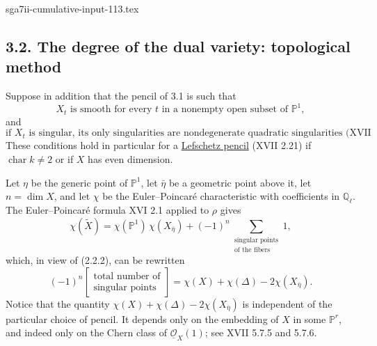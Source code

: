 \begin{filecontents*}{sga7ii-cumulative-input-113.tex}
\subsection*{3.2. The degree of the dual variety: topological method}

Suppose in addition that the pencil of 3.1 is such that
\begin{equation}\tag{3.2.1}
X_t\text{ is smooth for every }t\text{ in a nonempty open subset of }
\mathbb P^1,
\end{equation}
and
\begin{equation}\tag{3.2.2}
\text{if $X_t$ is singular, its only singularities are nondegenerate
quadratic singularities (XVII 1.1).}
\end{equation}
These conditions hold in particular for a \underline{Lefschetz pencil}
(XVII 2.21) if $\operatorname{char}k\ne2$ or if $X$ has even dimension.

Let $\eta$ be the generic point of $\mathbb P^1$, let $\bar\eta$ be a
geometric point above it, let $n=\dim X$, and let $\chi$ be the
Euler--Poincar\'e characteristic with coefficients in $\mathbb Q_\ell$.
The Euler--Poincar\'e formula XVI 2.1 applied to $\rho$ gives
\begin{equation}\tag{3.2.3}
\chi(\widetilde X)
=\chi(\mathbb P^1)\,\chi(X_{\bar\eta})
 +(-1)^n\sum_{\substack{\text{singular points}\\
                         \text{of the fibers}}}1,
\end{equation}
which, in view of (2.2.2), can be rewritten
\begin{equation}\tag{3.2.4}
(-1)^n
\left[\begin{array}{c}
\text{total number of}\\[3pt]
\text{singular points}
\end{array}\right]
=\chi(X)+\chi(\Delta)-2\chi(X_{\bar\eta}).
\end{equation}
Notice that the quantity
$\chi(X)+\chi(\Delta)-2\chi(X_{\bar\eta})$ is independent of the particular
choice of pencil.  It depends only on the embedding of $X$ in some
$\mathbb P^r$, and indeed only on the Chern class of
$\underline{\mathcal O}_X(1)$; see XVII 5.7.5 and 5.7.6.


\end{filecontents*}
